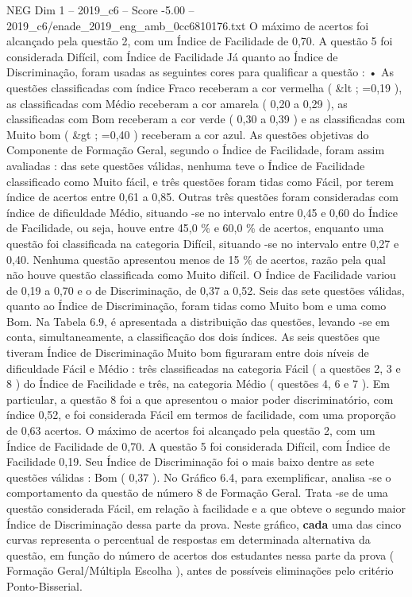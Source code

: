 \begin{textsample}{NEG Dim 1 – 2019\_c6 – Score -5.00 – 2019\_c6/enade\_2019\_eng\_amb\_0cc6810176.txt}
O máximo de acertos foi alcançado pela questão 2, com um Índice de Facilidade de 0,70.
A questão 5 foi considerada Difícil, com Índice de Facilidade Já quanto ao Índice de Discriminação, foram usadas as seguintes cores para qualificar a questão : • As questões classificadas com índice Fraco receberam a cor vermelha ( \&lt ; =0,19 ), as classificadas com Médio receberam a cor amarela ( 0,20 a 0,29 ), as classificadas com Bom receberam a cor verde ( 0,30 a 0,39 ) e as classificadas com Muito bom ( \&gt ; =0,40 ) receberam a cor azul.
As questões objetivas do Componente de Formação Geral, segundo o Índice de Facilidade, foram assim avaliadas : das sete questões válidas, nenhuma teve o Índice de Facilidade classificado como Muito fácil, e três questões foram tidas como Fácil, por terem índice de acertos entre 0,61 a 0,85.
Outras três questões foram consideradas com índice de dificuldade Médio, situando -se no intervalo entre 0,45 e 0,60 do Índice de Facilidade, ou seja, houve entre 45,0 \% e 60,0 \% de acertos, enquanto uma questão foi classificada na categoria Difícil, situando -se no intervalo entre 0,27 e 0,40.
Nenhuma questão apresentou menos de 15 \% de acertos, razão pela qual não houve questão classificada como Muito difícil.
O Índice de Facilidade variou de 0,19 a 0,70 e o de Discriminação, de 0,37 a 0,52.
Seis das sete questões válidas, quanto ao Índice de Discriminação, foram tidas como Muito bom e uma como Bom.
Na Tabela 6.9, é apresentada a distribuição das questões, levando -se em conta, simultaneamente, a classificação dos dois índices.
As seis questões que tiveram Índice de Discriminação Muito bom figuraram entre dois níveis de dificuldade Fácil e Médio : três classificadas na categoria Fácil ( a questões 2, 3 e 8 ) do Índice de Facilidade e três, na categoria Médio ( questões 4, 6 e 7 ).
Em particular, a questão 8 foi a que apresentou o maior poder discriminatório, com índice 0,52, e foi considerada Fácil em termos de facilidade, com uma proporção de 0,63 acertos.
O máximo de acertos foi alcançado pela questão 2, com um Índice de Facilidade de 0,70.
A questão 5 foi considerada Difícil, com Índice de Facilidade 0,19.
Seu Índice de Discriminação foi o mais baixo dentre as sete questões válidas : Bom ( 0,37 ).
No Gráfico 6.4, para exemplificar, analisa -se o comportamento da questão de número 8 de Formação Geral.
Trata -se de uma questão considerada Fácil, em relação à facilidade e a que obteve o segundo maior Índice de Discriminação dessa parte da prova.
Neste gráfico, \textbf{cada} uma das cinco curvas representa o percentual de respostas em determinada alternativa da questão, em função do número de acertos dos estudantes nessa parte da prova ( Formação Geral/Múltipla Escolha ), antes de possíveis eliminações pelo critério Ponto-Bisserial.

\end{textsample}
